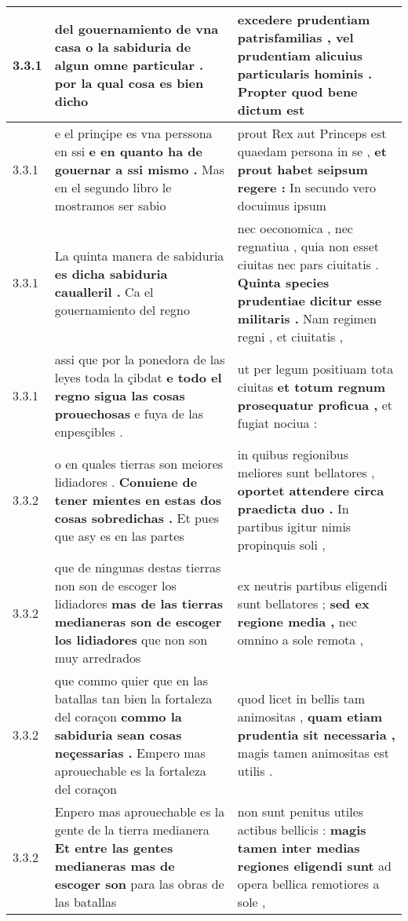 \begin{tabular}{|p{1cm}|p{6.5cm}|p{6.5cm}|}
3.3.1 & del gouernamiento de vna casa \textbf{ o la sabiduria de algun omne particular . } por la qual cosa es bien dicho & excedere prudentiam patrisfamilias , \textbf{ vel prudentiam alicuius particularis hominis . } Propter quod bene dictum est \\\hline
3.3.1 & e el prinçipe es vna perssona en ssi \textbf{ e en quanto ha de gouernar a ssi mismo . } Mas en el segundo libro le mostramos ser sabio & prout Rex aut Princeps est quaedam persona in se , \textbf{ et prout habet seipsum regere : } In secundo vero docuimus ipsum \\\hline
3.3.1 & La quinta manera de sabiduria \textbf{ es dicha sabiduria caualleril . } Ca el gouernamiento del regno & nec oeconomica , nec regnatiua , quia non esset ciuitas nec pars ciuitatis . \textbf{ Quinta species prudentiae dicitur esse militaris . } Nam regimen regni , et ciuitatis , \\\hline
3.3.1 & assi que por la ponedora de las leyes toda la çibdat \textbf{ e todo el regno sigua las cosas prouechosas } e fuya de las enpesçibles . & ut per legum positiuam tota ciuitas \textbf{ et totum regnum prosequatur proficua , } et fugiat nociua : \\\hline
3.3.2 & o en quales tierras son meiores lidiadores . \textbf{ Conuiene de tener mientes en estas dos cosas sobredichas . } Et pues que asy es en las partes & in quibus regionibus meliores sunt bellatores , \textbf{ oportet attendere circa praedicta duo . } In partibus igitur nimis propinquis soli , \\\hline
3.3.2 & que de ningunas destas tierras non son de escoger los lidiadores \textbf{ mas de las tierras medianeras son de escoger los lidiadores } que non son muy arredrados & ex neutris partibus eligendi sunt bellatores ; \textbf{ sed ex regione media , } nec omnino a sole remota , \\\hline
3.3.2 & que commo quier que en las batallas tan bien la fortaleza del coraçon \textbf{ commo la sabiduria sean cosas neçessarias . } Empero mas aprouechable es la fortaleza del coraçon & quod licet in bellis tam animositas , \textbf{ quam etiam prudentia sit necessaria , } magis tamen animositas est utilis . \\\hline
3.3.2 & Enpero mas aprouechable es la gente de la tierra medianera \textbf{ Et entre las gentes medianeras mas de escoger son } para las obras de las batallas & non sunt penitus utiles actibus bellicis : \textbf{ magis tamen inter medias regiones eligendi sunt } ad opera bellica remotiores a sole , \\\hline

\end{tabular}
